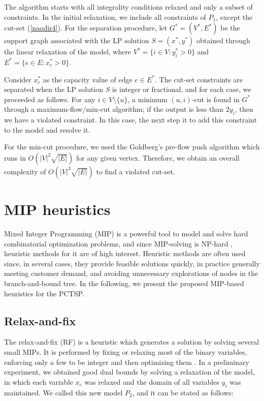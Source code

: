 \documentclass{ro}
\begin{document}
The algorithm starts with all integrality conditions relaxed and only a subset of constraints. In the initial relaxation, we include all constraints of $P_1$, except the cut-set (\ref{naodir4}). For the separation procedure, let $G^*=(V^*,E^*)$ be the support graph associated with the LP solution $S=(x^*,y^*)$ obtained through the linear relaxation  of the model, where $V^* = \{i \in V : y_i^* > 0\}$ and $E^* = \{e \in E : x_e^* >0 \}$. 

Consider  $x_e^*$ as the capacity value of edge $e \in E^*$.
The cut-set constraints are separated when the LP solution $S$ is integer or fractional, and for each case, we proceeded as follows. For any $i \in V \setminus \{u\}$, a minimum $(u,i)$-cut is found in $G^*$ through a maximum-flow/min-cut algorithm; if the output is less than $2y_i$, then we have a violated constraint. In this case, the next step it to add this constraint to the model and resolve it.

For the min-cut procedure, we used the Goldberg's pre-flow push algorithm \cite{ciupala2008preflow} which runs in $O(|V|^2\sqrt{|E|})$ for any given vertex. Therefore, we obtain an overall complexity of $O(|V|^3\sqrt{|E|})$   to find a violated cut-set.


\section{MIP heuristics}
\label{sec:mip}
Mixed Integer Programming (MIP) is a powerful tool to model and solve hard combinatorial optimization problems, and since MIP-solving is NP-hard \cite{wolsey2014integer}, heuristic methods for it are of high interest. Heuristic methods are often used since, in several cases, they provide feasible solutions quickly, in practice generally meeting customer demand, and avoiding unnecessary explorations of nodes in the branch-and-bound tree. In the following, we present the proposed MIP-based heuristics for the PCTSP.

\subsection{Relax-and-fix}

The relax-and-fix (RF) is a  heuristic  which  generates  a  solution  by  solving  several small MIPs. It is performed by fixing or relaxing most of the binary variables, enforcing only a few to be integer and then optimizing them \cite{toledo2015relax}. In a preliminary experiment, we obtained good dual bounds by solving a relaxation of the model, in which each variable $x_e$  was relaxed and the domain of all  variables $y_i$ was maintained. We called this new model $P_2$, and it can be stated as follows:
\end{document}
